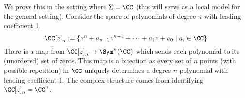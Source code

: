 

    We prove this in the setting where $\Sigma=\CC$ (this will serve as a local model for the general setting). 
    Consider the space of polynomials of degree $n$ with leading coefficient 1, 
    \[\CC[z]_n:=\{z^n+a_{n-1}z^{n-1}+\cdots + a_1z+a_0\;|\; a_i\in \CC\}\]
    There is a map from $\CC[z]_n\to \Sym^n(\CC)$ which sends each polynomial to its (unordered) set of zeros. This map is a bijection as every set of $n$ points (with possible repetition) in $\CC$ uniquely determines a degree $n$ polynomial with leading coefficient 1.
    The complex structure comes from identifying $\CC[z]_n = \CC^n$.
